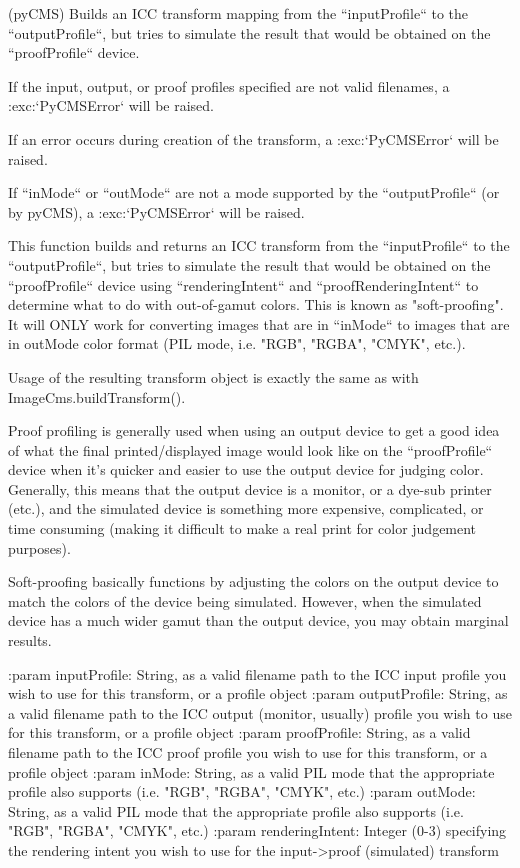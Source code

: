 \begin{DoxyVerb}(pyCMS) Builds an ICC transform mapping from the ``inputProfile`` to the
``outputProfile``, but tries to simulate the result that would be
obtained on the ``proofProfile`` device.

If the input, output, or proof profiles specified are not valid
filenames, a :exc:`PyCMSError` will be raised.

If an error occurs during creation of the transform,
a :exc:`PyCMSError` will be raised.

If ``inMode`` or ``outMode`` are not a mode supported by the ``outputProfile``
(or by pyCMS), a :exc:`PyCMSError` will be raised.

This function builds and returns an ICC transform from the ``inputProfile``
to the ``outputProfile``, but tries to simulate the result that would be
obtained on the ``proofProfile`` device using ``renderingIntent`` and
``proofRenderingIntent`` to determine what to do with out-of-gamut
colors.  This is known as "soft-proofing".  It will ONLY work for
converting images that are in ``inMode`` to images that are in outMode
color format (PIL mode, i.e. "RGB", "RGBA", "CMYK", etc.).

Usage of the resulting transform object is exactly the same as with
ImageCms.buildTransform().

Proof profiling is generally used when using an output device to get a
good idea of what the final printed/displayed image would look like on
the ``proofProfile`` device when it's quicker and easier to use the
output device for judging color.  Generally, this means that the
output device is a monitor, or a dye-sub printer (etc.), and the simulated
device is something more expensive, complicated, or time consuming
(making it difficult to make a real print for color judgement purposes).

Soft-proofing basically functions by adjusting the colors on the
output device to match the colors of the device being simulated. However,
when the simulated device has a much wider gamut than the output
device, you may obtain marginal results.

:param inputProfile: String, as a valid filename path to the ICC input
    profile you wish to use for this transform, or a profile object
:param outputProfile: String, as a valid filename path to the ICC output
    (monitor, usually) profile you wish to use for this transform, or a
    profile object
:param proofProfile: String, as a valid filename path to the ICC proof
    profile you wish to use for this transform, or a profile object
:param inMode: String, as a valid PIL mode that the appropriate profile
    also supports (i.e. "RGB", "RGBA", "CMYK", etc.)
:param outMode: String, as a valid PIL mode that the appropriate profile
    also supports (i.e. "RGB", "RGBA", "CMYK", etc.)
:param renderingIntent: Integer (0-3) specifying the rendering intent you
    wish to use for the input->proof (simulated) transform


\end{DoxyVerb}
